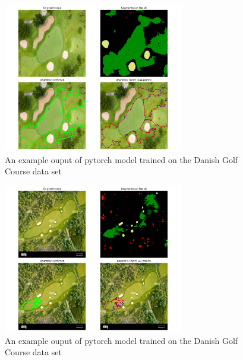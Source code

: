 \documentclass[final]{cmpreport_02}
\begin{document}
\begin{figure}[h!]
	\centering
	\includegraphics[width=0.7\textwidth]{./images/AdobeGolf_visualisation.png}
	\caption{An example ouput of pytorch model trained on the Danish Golf Course data set}
	\label{am:AGDanish}
\end{figure}

\begin{figure}[h!]
	\centering
	\includegraphics[width=0.7\textwidth]{./images/overheadGolfCourse_visualisation.png}
	\caption{An example ouput of pytorch model trained on the Danish Golf Course data set}
	\label{am:ohGCDanish}
\end{figure}
\end{document}
